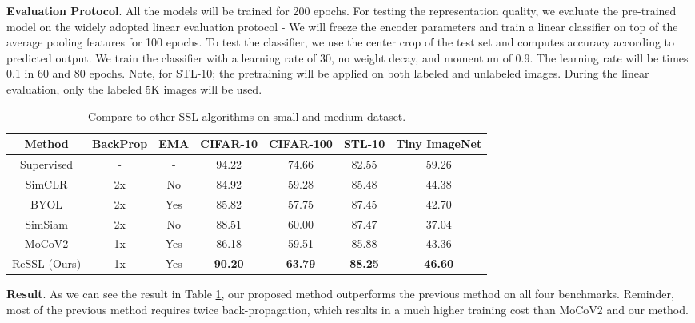 \documentclass{article}
\newcommand{\<}{\left\langle}
\renewcommand{\>}{\right\rangle}
\begin{document}
\textbf{Evaluation Protocol}.
All the models will be trained for 200 epochs. For testing the representation quality, we evaluate the pre-trained model on the widely adopted linear evaluation protocol - We will freeze the encoder parameters and train a linear classifier on top of the average pooling features for 100 epochs. To test the classifier, we use the center crop of the test set and computes accuracy according to predicted output. We train the classifier with a learning rate of 30, no weight decay, and momentum of 0.9. The learning rate will be times 0.1 in 60 and 80 epochs. Note, for STL-10; the pretraining will be applied on both labeled and unlabeled images. During the linear evaluation, only the labeled 5K images will be used.
\vspace{-5pt}

\renewcommand\arraystretch{1.12}
\begin{table}[h]
 \centering
 \setlength\tabcolsep{10pt}
 \small
 \caption{Compare to other SSL algorithms on small and medium dataset.}
 \vspace{-5pt}
 \label{table:compare_smalldata}
\begin{tabular}{c c c c c c c} 
\toprule 
Method & BackProp & EMA & CIFAR-10 & CIFAR-100 & STL-10 & Tiny ImageNet \\ \hline
Supervised            & -  & -   & 94.22 & 74.66 & 82.55 & 59.26 \\ \hline
SimCLR \cite{simclr}  & 2x & No  & 84.92 & 59.28 & 85.48 & 44.38 \\
BYOL \cite{byol}      & 2x & Yes & 85.82 & 57.75 & 87.45 & 42.70 \\
SimSiam \cite{SimSiam}& 2x & No  & 88.51 & 60.00 & 87.47 & 37.04 \\
MoCoV2  \cite{mocov2} & 1x & Yes & 86.18 & 59.51 & 85.88 & 43.36 \\
ReSSL (Ours)          & 1x & Yes & \textbf{90.20} & \textbf{63.79} & \textbf{88.25} & \textbf{46.60}  \\
\toprule 
\end{tabular}
\end{table}

\vspace{-5pt}
\textbf{Result}.
As we can see the result in Table \ref{table:compare_smalldata}, our proposed method outperforms the previous method on all four benchmarks. Reminder, most of the previous method requires twice back-propagation, which results in a much higher training cost than MoCoV2 and our method.
\end{document}
